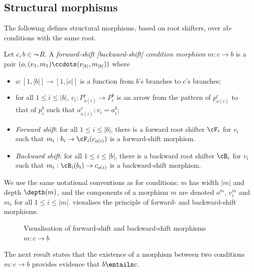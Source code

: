 \subsection{Structural morphisms}

The following defines structural morphisms, based on root shifters, over ab-conditions with the same root.

\begin{definition}
  Let $c,b \in \AC{R}$. A \emph{forward-shift [backward-shift] condition morphism} $m: c \to b$ is a pair $(o,(v_1,m_1)\ccdots (v_{|b|},m_{|b|}))$ where
  \begin{itemize}[topsep=\smallskipamount]
  \item $o:[1,|b|]\to[1,|c|]$ is a function from $b$'s branches to $c$'s branches;
  \item for all $1\leq i\leq |b|$, $v_i:P^c_{o(i)}\to P^b_i$ is an arrow from the pattern of $p^c_{o(i)}$ to that of $p^b_i$ such that $a^c_{o(i)};v_i=a^b_i$;
  \item\emph{Forward shift}: for all $1\leq i\leq |b|$, there is a forward root shifter $\cF_i$ for $v_i$ such that $m_i:b_i \to \cF_i(c_{o(i)})$ is a forward-shift morphism.
  \item\emph{Backward shift}: for all $1\leq i\leq |b|$, there is a backward root shifter $\cB_i$ for $v_i$ such that $m_i:\cB_i(b_i) \to c_{o(i)}$ is a backward-shift morphism.
  \end{itemize}
\end{definition}
%
We use the same notational conventions as for conditions: $m$ has width $|m|$ and depth $\depth(m)$, and the components of a morphism $m$ are denoted $o^m$, $v^m_i$ and $m_i$ for all $1\leq i\leq |m|$.  visualises the principle of forward- and backward-shift morphisms.
%
\begin{figure}[t]
\centering

\caption{Visualisation of forward-shift and backward-shift morphisms $m:c \to b$}
\end{figure}
%
The next result states that the existence of a morphism between two conditions $m: c \to b$ provides evidence that $b\entails c$.

